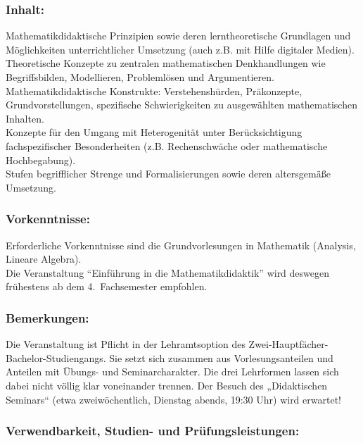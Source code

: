 \documentclass[a4paper,10pt]{article}
\begin{document}
\subsubsection*{\large
    Inhalt:
}
Mathematikdidaktische Prinzipien sowie deren lerntheoretische Grundlagen und Möglichkeiten unterrichtlicher Umsetzung (auch z.B. mit Hilfe digitaler Medien). \\
Theoretische Konzepte zu zentralen mathematischen Denkhandlungen wie Begriffsbilden, Modellieren, Problemlösen und Argumentieren. \\
Mathematikdidaktische Konstrukte: Verstehenshürden, Präkonzepte, Grundvorstellungen, spezifische Schwierigkeiten zu ausgewählten mathematischen Inhalten. \\
Konzepte für den Umgang mit Heterogenität unter Berücksichtigung fachspezifischer Besonderheiten (z.B. Rechenschwäche oder mathematische Hochbegabung).\\
Stufen begrifflicher Strenge und Formalisierungen sowie deren altersgemäße Umsetzung.
\subsubsection*{\large
    Vorkenntnisse:
}
Erforderliche Vorkenntnisse sind die Grundvorlesungen in Mathematik (Analysis, Lineare Algebra). \\
Die Veranstaltung "`Einführung in die Mathematikdidaktik"' wird deswegen frühestens ab dem 4.~Fachsemester empfohlen.
\subsubsection*{\large
    Bemerkungen:
}
Die Veranstaltung ist Pflicht in der Lehramtsoption des Zwei-Hauptfächer-Bachelor-Studiengangs. Sie  setzt sich zusammen aus Vorlesungsanteilen und Anteilen mit Übungs- und Seminarcharakter. Die drei Lehrformen lassen sich dabei nicht völlig klar voneinander trennen.
Der Besuch des „Didaktischen Seminars“ (etwa zweiwöchentlich, Dienstag abends, 19:30 Uhr) wird erwartet!
\subsubsection*{\large
    Verwendbarkeit, Studien- und Prüfungsleistungen:
}
\end{document}
